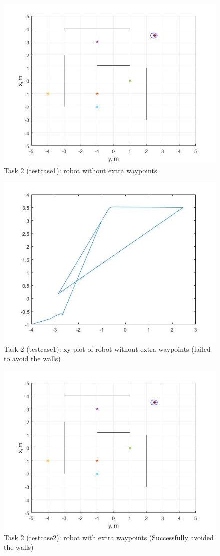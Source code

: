 \documentclass{l4proj}
\begin{document}
\begin{figure}[htb]
    \centering
    \includegraphics[width=0.5\linewidth]{images/Robot.jpg}

    \caption{Task 2 (testcase1): robot without extra waypoints}
    \label{fig:Model1sim4} 
\end{figure}
\begin{figure}[htb]
    \centering
    \includegraphics[width=0.5\linewidth]{images/task2test1xyplot.jpg}

    \caption{Task 2 (testcase1): xy plot of robot without extra waypoints (failed to avoid the walls)}
    \label{fig:Model1sim4} 
\end{figure}
\begin{figure}[htb]
    \centering
    \includegraphics[width=0.5\linewidth]{images/task2test2robot.jpg}

    \caption{Task 2 (testcase2): robot with extra waypoints (Successfully avoided the walls)}
    \label{fig:Model1sim4} 
\end{figure}
\end{document}
